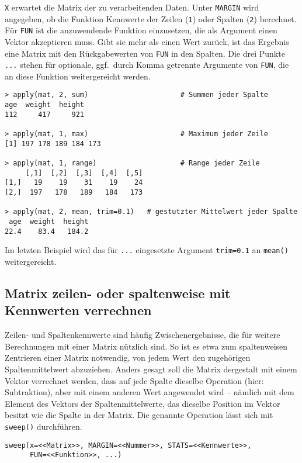 \lstinline!X! erwartet die Matrix der zu verarbeitenden Daten. Unter \lstinline!MARGIN! wird angegeben, ob die Funktion Kennwerte der Zeilen (\lstinline!1!) oder Spalten (\lstinline!2!) berechnet. Für \lstinline!FUN! ist die anzuwendende Funktion einzusetzen, die als Argument einen Vektor akzeptieren muss. Gibt sie mehr als einen Wert zurück, ist das Ergebnis eine Matrix mit den Rückgabewerten von \lstinline!FUN! in den Spalten. Die drei Punkte \lstinline!...! stehen für optionale, ggf.\ durch Komma getrennte Argumente von \lstinline!FUN!, die an diese Funktion weitergereicht werden.
\begin{lstlisting}
> apply(mat, 2, sum)                      # Summen jeder Spalte
age  weight  height
112     417     921

> apply(mat, 1, max)                      # Maximum jeder Zeile
[1] 197 178 189 184 173

> apply(mat, 1, range)                    # Range jeder Zeile
     [,1]  [,2]  [,3]  [,4]  [,5]
[1,]   19    19    31    19    24
[2,]  197   178   189   184   173

> apply(mat, 2, mean, trim=0.1)   # gestutzter Mittelwert jeder Spalte
 age  weight  height
22.4    83.4   184.2
\end{lstlisting}

Im letzten Beispiel wird das für \lstinline!...! eingesetzte Argument \lstinline!trim=0.1! an \lstinline!mean()! weitergereicht.

\subsection{Matrix zeilen- oder spaltenweise mit Kennwerten verrechnen}
\label{sec:mat_colwise}

Zeilen- und Spaltenkennwerte sind häufig Zwischenergebnisse, die für weitere Berechnungen mit einer Matrix nützlich sind. So ist es etwa zum spaltenweisen Zentrieren einer Matrix notwendig, von jedem Wert den zugehörigen Spaltenmittelwert abzuziehen. Anders gesagt soll die Matrix dergestalt mit einem Vektor verrechnet werden, dass auf jede Spalte dieselbe Operation (hier: Subtraktion), aber mit einem anderen Wert angewendet wird -- nämlich mit dem Element des Vektors der Spaltenmittelwerte, das dieselbe Position im Vektor besitzt wie die Spalte in der Matrix. Die genannte Operation lässt sich mit \lstinline!sweep()! durchführen.
\begin{lstlisting}
sweep(x=<<Matrix>>, MARGIN=<<Nummer>>, STATS=<<Kennwerte>>,
      FUN=<<Funktion>>, ...)
\end{lstlisting}

